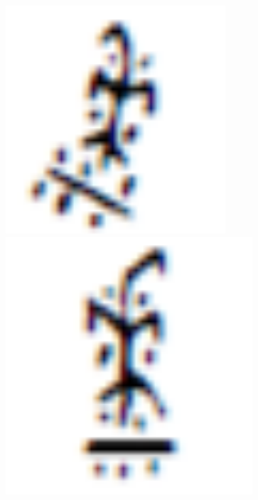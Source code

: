 \documentclass[journal]{IEEEtran}
\begin{document}
\begin{figure}[h]
\begin{minipage}{0.2\linewidth}
		\includegraphics[width=0.8\linewidth]{fig/observation-1-3.png}
		\includegraphics[width=0.8\linewidth]{fig/observation-1-4.png}
	\end{minipage}
	\begin{minipage}{0.2\linewidth}

\end{minipage}
\end{figure}
\end{document}
